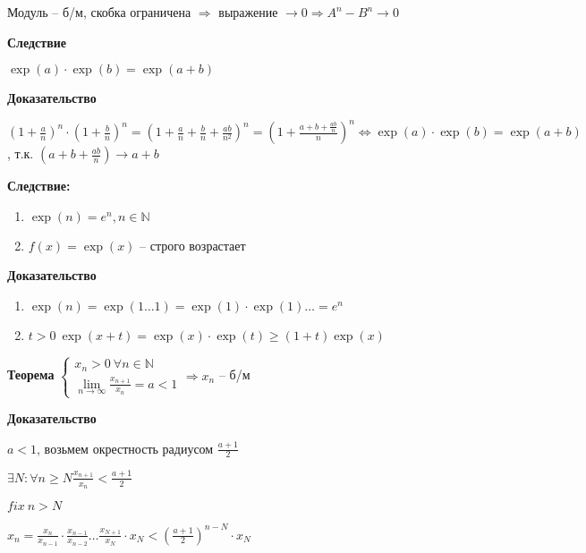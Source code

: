 \documentclass[14pt, letter paper]{article}
\begin{document}
Модуль -- б/м, скобка ограничена $\Rightarrow$ выражение $\rightarrow 0 \Rightarrow A^n - B^n \rightarrow 0$

\textbf{Следствие}

$\exp(a) \cdot \exp(b) = \exp(a + b)$

\begin{center}
    \textbf{Доказательство}
\end{center}

$(1 + \frac{a}{n})^n \cdot ( 1 + \frac{b}{n})^n = ( 1 + \frac{a}{n} + \frac{b}{n} + \frac{ab}{n^2})^n = ( 1 + \frac{a + b + \frac{ab}{n}}{n})^n \Leftrightarrow \exp(a) \cdot \exp(b) = \exp(a + b)$, т.к. $(a + b + \frac{ab}{n}) \rightarrow a + b$

\textbf{Следствие:}

\begin{enumerate}
    \item $\exp(n) = e^n, n \in \mathds{N}$
    \item $f(x) = \exp(x)$ -- строго возрастает
\end{enumerate}

\begin{center}
    \textbf{Доказательство}
\end{center}

\begin{enumerate}
    \item $\exp(n) = \exp(1\ldots1) = \exp(1) \cdot \exp(1) \ldots = e^n$
    \item $t > 0\ \exp(x+t) = \exp(x) \cdot \exp(t) \geq (1 + t)\exp(x)$
\end{enumerate}

\textbf{Теорема} $\begin{cases}
    x_n > 0\ \forall n \in \mathds{N} \\
    \lim\limits_{n \rightarrow \infty}{\frac{x_{n+1}}{x_n}} = a < 1
\end{cases} \Rightarrow x_n$ -- б/м

\begin{center}
    \textbf{Доказательство}
\end{center}

$a < 1$, возьмем окрестность радиусом $\frac{a+1}{2}$

$\exists N : \forall n \geq N \frac{x_{n+1}}{x_n} < \frac{a+1}{2}$

$fix\ n > N$

$x_n = \frac{x_n}{x_{n-1}} \cdot \frac{x_{n-1}}{x_{n-2}} \ldots \frac{x_{N+1}}{x_N} \cdot x_N < (\frac{a+1}{2})^{n-N}\cdot x_N$
\end{document}
